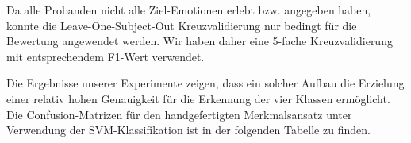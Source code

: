 Da alle Probanden nicht alle Ziel-Emotionen erlebt bzw. angegeben haben, konnte die Leave-One-Subject-Out Kreuzvalidierung nur bedingt f{\"u}r die Bewertung angewendet werden.
Wir haben daher eine 5-fache Kreuzvalidierung mit entsprechendem F1-Wert verwendet. 

\begin{table}[h]
 \vspace{0.3cm} \caption[Durchschnittlicher F1-Wert]{ Durchschnittlicher F1-Wert in \% f{\"u}r die f{\"u}nf Falten des Datensatzes. }
\end{table}
\vspace{0.5cm}



Die Ergebnisse unserer Experimente zeigen, dass ein solcher Aufbau die Erzielung einer relativ hohen Genauigkeit f{\"u}r die Erkennung der vier Klassen erm{\"o}glicht.
Die Confusion-Matrizen f{\"u}r den handgefertigten Merkmalsansatz unter Verwendung der SVM-Klassifikation ist in der folgenden Tabelle zu finden.

\begin{table}[h]
 \vspace{0.3cm} \caption[Confusion Matrix]{ Confusion Matrix in \% f{\"u}r die f{\"u}nf Falten des Datensatzes. }
\end{table}
